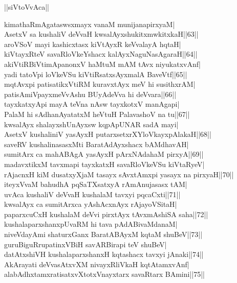 \documentclass{article}
\begin{document}
\begin{center}
||siVtoVvAca||
\end{center}

kimathaRmAgataswsxmayx vanaM munijanapirxyaM|\\
AsetxV sa kushaliV deVvaH kwsalAyxshukitxmwkitxkaH||63||\\
aroVSoV mayi kashicxtasx kiVtAyxR keVvalayA hqtaH|\\
kiVtayxRteV savaRloVkeYshacx kalAyxNaguNasAgaraH||64||\\
akiVtiRBiVtimApanonxV haMtuM mAM tAvx niyukatxvAnf|\\
yadi tatoVpi loVkeVSu kiVtiRsatxsAyxmalA BaveVtf||65||\\
mqtAvxpi patisatikxVtiRM kuravxtAyx meV hi susithxrAM|\\
patisAmiVpayxmeVvAshu BUyAdeVva hi deVvara||66||\\
tayxkatxyApi mayA teVna nAsw tayxkotxV manAgapi|\\
PalaM hi sAdhanAyatatxM heVtuH PalavashoV na tu||67||\\
kwsalAyx shalayxshUnAyxsw kqpApUNAR sadA mayi|\\
AsetxV kushaliniV yasAyxH putarxsetxrXYloVkayxpAlakaH||68||\\
saveRV kushalinasasxMti BaratAdAyxshacx bAMdhavAH|\\
sumitArx ca mahABAgA yasAyxH pArxNAdahaM pirxyA||69||\\
madavxtikxM tavxmapi tayxkatxH savaRloVkeVSu kiVtaRyeV|\\
rAjacnxH kiM dusatxyXjaM tasayx sAvxtAmxpi yasayx na pirxyaH||70||\\
iteyxVvaM bahudhA pqSaTXsatxyA rAmAnujasasx tAM|\\
uvAca kushaliV deVvaH kushalaM tavxyi pqcaCxti||71||\\
kwsalAyx ca sumitArxca yAshAcxnAyx rAjayoVSitaH|\\
paparxcuCxH kushalaM deVvi pirxtAyx tAvxmAshiSA saha||72||\\
kushalaparxshanxpUvaRM hi tava pAdABivaMdanaM|\\
niveVdayAmi shaturxGanx BaratABAyxM kqtaM shuBeV||73||\\
guruBiguRrupatinxVBiH savARBirapi teV shuBeV|\\
datAtxshiVH kushalaparxshanxH kqtashacx tavxyi jAnaki||74||\\
AkArayati deVvasAtxvXM nivayxRliVkaH kqtAtamxvAnf|\\
alabAdhxtamxratisatxvXtotxVnayxtarx savaRtarx BAmini||75||\\
\end{document}
